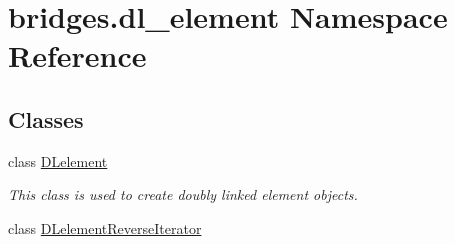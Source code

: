 \hypertarget{namespacebridges_1_1dl__element}{}\section{bridges.\+dl\+\_\+element Namespace Reference}
\label{namespacebridges_1_1dl__element}
\subsection*{Classes}
\begin{DoxyCompactItemize}
\item 
class \hyperlink{classbridges_1_1dl__element_1_1_d_lelement}{D\+Lelement}
\begin{DoxyCompactList}\small\item\em This class is used to create doubly linked element objects. \end{DoxyCompactList}\item 
class \hyperlink{classbridges_1_1dl__element_1_1_d_lelement_reverse_iterator}{D\+Lelement\+Reverse\+Iterator}
\end{DoxyCompactItemize}
